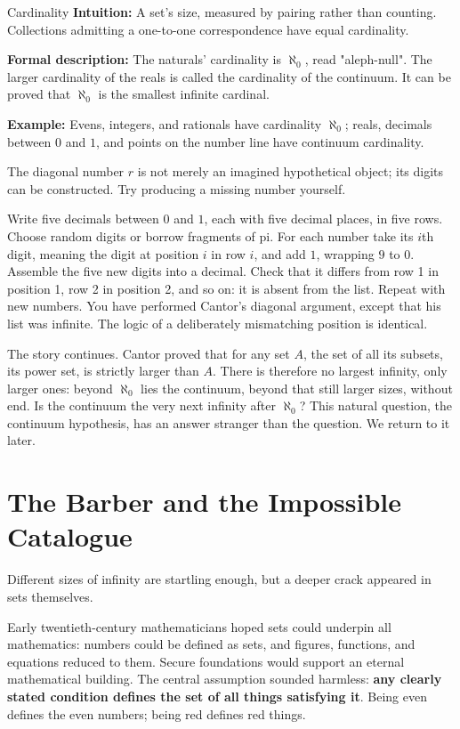 \begin{shuyu}{Cardinality}
\textbf{Intuition:} A set's size, measured by pairing rather than counting. Collections admitting a one-to-one correspondence have equal cardinality.

\textbf{Formal description:} The naturals' cardinality is $\aleph_0$, read "aleph-null". The larger cardinality of the reals is called the cardinality of the continuum. It can be proved that $\aleph_0$ is the smallest infinite cardinal.

\textbf{Example:} Evens, integers, and rationals have cardinality $\aleph_0$; reals, decimals between $0$ and $1$, and points on the number line have continuum cardinality.
\end{shuyu}

The diagonal number $r$ is not merely an imagined hypothetical object; its digits can be constructed. Try producing a missing number yourself.

\begin{shiyan}
Write five decimals between $0$ and $1$, each with five decimal places, in five rows. Choose random digits or borrow fragments of pi. For each number take its $i$th digit, meaning the digit at position $i$ in row $i$, and add $1$, wrapping $9$ to $0$. Assemble the five new digits into a decimal. Check that it differs from row 1 in position 1, row 2 in position 2, and so on: it is absent from the list. Repeat with new numbers. You have performed Cantor's diagonal argument, except that his list was infinite. The logic of a deliberately mismatching position is identical.
\end{shiyan}

The story continues. Cantor proved that for any set $A$, the set of all its subsets, its power set, is strictly larger than $A$. There is therefore no largest infinity, only larger ones: beyond $\aleph_0$ lies the continuum, beyond that still larger sizes, without end. Is the continuum the very next infinity after $\aleph_0$? This natural question, the continuum hypothesis, has an answer stranger than the question. We return to it later.

\section{The Barber and the Impossible Catalogue}

Different sizes of infinity are startling enough, but a deeper crack appeared in sets themselves.

Early twentieth-century mathematicians hoped sets could underpin all mathematics: numbers could be defined as sets, and figures, functions, and equations reduced to them. Secure foundations would support an eternal mathematical building. The central assumption sounded harmless: \textbf{any clearly stated condition defines the set of all things satisfying it}. Being even defines the even numbers; being red defines red things.

